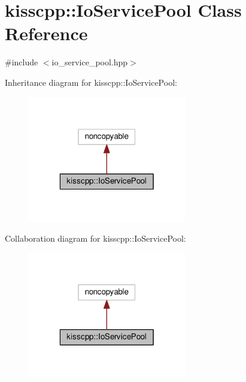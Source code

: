\hypertarget{classkisscpp_1_1_io_service_pool}{\section{kisscpp\-:\-:Io\-Service\-Pool Class Reference}
\label{classkisscpp_1_1_io_service_pool}
}


{\ttfamily \#include $<$io\-\_\-service\-\_\-pool.\-hpp$>$}



Inheritance diagram for kisscpp\-:\-:Io\-Service\-Pool\-:
\nopagebreak
\begin{figure}[H]
\begin{center}
\leavevmode
\includegraphics[width=196pt]{classkisscpp_1_1_io_service_pool__inherit__graph}
\end{center}
\end{figure}


Collaboration diagram for kisscpp\-:\-:Io\-Service\-Pool\-:
\nopagebreak
\begin{figure}[H]
\begin{center}
\leavevmode
\includegraphics[width=196pt]{classkisscpp_1_1_io_service_pool__coll__graph}
\end{center}
\end{figure}
